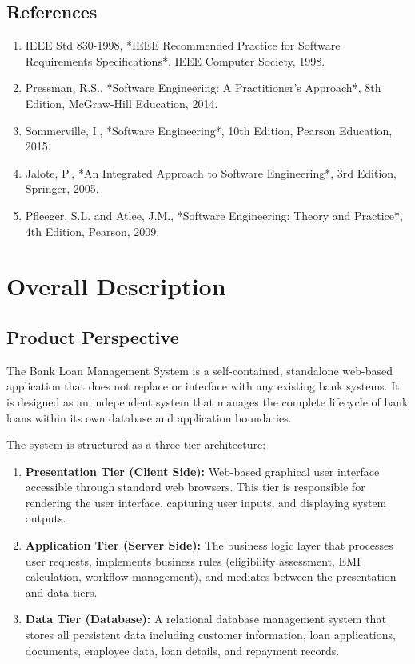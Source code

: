 \documentclass[12pt,a4paper,oneside]{report}
\begin{document}
\subsection{References}

\begin{enumerate}
  \item IEEE Std 830-1998, *IEEE Recommended Practice for Software Requirements Specifications*, IEEE Computer Society, 1998.
  \item Pressman, R.S., *Software Engineering: A Practitioner's Approach*, 8th Edition, McGraw-Hill Education, 2014.
  \item Sommerville, I., *Software Engineering*, 10th Edition, Pearson Education, 2015.
  \item Jalote, P., *An Integrated Approach to Software Engineering*, 3rd Edition, Springer, 2005.
  \item Pfleeger, S.L. and Atlee, J.M., *Software Engineering: Theory and Practice*, 4th Edition, Pearson, 2009.
\end{enumerate}

\section{Overall Description}

\subsection{Product Perspective}

The Bank Loan Management System is a self-contained, standalone web-based application that does not replace or interface with any existing bank systems. It is designed as an independent system that manages the complete lifecycle of bank loans within its own database and application boundaries.

The system is structured as a three-tier architecture:

\begin{enumerate}
  \item \textbf{Presentation Tier (Client Side):} Web-based graphical user interface accessible through standard web browsers. This tier is responsible for rendering the user interface, capturing user inputs, and displaying system outputs.
  \item \textbf{Application Tier (Server Side):} The business logic layer that processes user requests, implements business rules (eligibility assessment, EMI calculation, workflow management), and mediates between the presentation and data tiers.
  \item \textbf{Data Tier (Database):} A relational database management system that stores all persistent data including customer information, loan applications, documents, employee data, loan details, and repayment records.
\end{enumerate}
\end{document}
